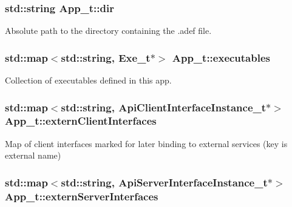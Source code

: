 \subsubsection[{\texorpdfstring{dir}{dir}}]{\setlength{\rightskip}{0pt plus 5cm}std\+::string App\+\_\+t\+::dir}\hypertarget{struct_app__t_aa81475448f122c6a630dbdd7d241df3f}{}\label{struct_app__t_aa81475448f122c6a630dbdd7d241df3f}


Absolute path to the directory containing the .adef file. 

\subsubsection[{\texorpdfstring{executables}{executables}}]{\setlength{\rightskip}{0pt plus 5cm}std\+::map$<$std\+::string, {\bf Exe\+\_\+t}$\ast$$>$ App\+\_\+t\+::executables}\hypertarget{struct_app__t_adec27f21af64fb0b0fcecc083006d62d}{}\label{struct_app__t_adec27f21af64fb0b0fcecc083006d62d}


Collection of executables defined in this app. 

\subsubsection[{\texorpdfstring{extern\+Client\+Interfaces}{externClientInterfaces}}]{\setlength{\rightskip}{0pt plus 5cm}std\+::map$<$std\+::string, {\bf Api\+Client\+Interface\+Instance\+\_\+t}$\ast$$>$ App\+\_\+t\+::extern\+Client\+Interfaces}\hypertarget{struct_app__t_ac04a0e6623cf0b9b2c6873e45d74bd1d}{}\label{struct_app__t_ac04a0e6623cf0b9b2c6873e45d74bd1d}


Map of client interfaces marked for later binding to external services (key is external name) 

\subsubsection[{\texorpdfstring{extern\+Server\+Interfaces}{externServerInterfaces}}]{\setlength{\rightskip}{0pt plus 5cm}std\+::map$<$std\+::string, {\bf Api\+Server\+Interface\+Instance\+\_\+t}$\ast$$>$ App\+\_\+t\+::extern\+Server\+Interfaces}\hypertarget{struct_app__t_a5e53d548e39c87b357bfc917b752720c}{}\label{struct_app__t_a5e53d548e39c87b357bfc917b752720c}


